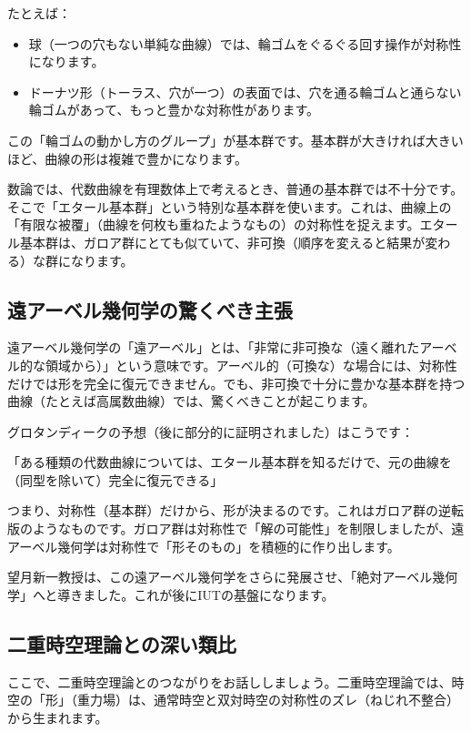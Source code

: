 \documentclass[dvipdfmx,12pt,a4paper]{jsarticle}
\begin{document}
たとえば：
\begin{itemize}
  \item 球（一つの穴もない単純な曲線）では、輪ゴムをぐるぐる回す操作が対称性になります。
  \item ドーナツ形（トーラス、穴が一つ）の表面では、穴を通る輪ゴムと通らない輪ゴムがあって、もっと豊かな対称性があります。
\end{itemize}

この「輪ゴムの動かし方のグループ」が基本群です。基本群が大きければ大きいほど、曲線の形は複雑で豊かになります。

数論では、代数曲線を有理数体上で考えるとき、普通の基本群では不十分です。そこで「エタール基本群」という特別な基本群を使います。これは、曲線上の「有限な被覆」（曲線を何枚も重ねたようなもの）の対称性を捉えます。エタール基本群は、ガロア群にとても似ていて、非可換（順序を変えると結果が変わる）な群になります。

\subsection{遠アーベル幾何学の驚くべき主張}

遠アーベル幾何学の「遠アーベル」とは、「非常に非可換な（遠く離れたアーベル的な領域から）」という意味です。アーベル的（可換な）な場合には、対称性だけでは形を完全に復元できません。でも、非可換で十分に豊かな基本群を持つ曲線（たとえば高属数曲線）では、驚くべきことが起こります。

グロタンディークの予想（後に部分的に証明されました）はこうです：

「ある種類の代数曲線については、エタール基本群を知るだけで、元の曲線を（同型を除いて）完全に復元できる」

つまり、対称性（基本群）だけから、形が決まるのです。これはガロア群の逆転版のようなものです。ガロア群は対称性で「解の可能性」を制限しましたが、遠アーベル幾何学は対称性で「形そのもの」を積極的に作り出します。

望月新一教授は、この遠アーベル幾何学をさらに発展させ、「絶対アーベル幾何学」へと導きました。これが後にIUTの基盤になります。

\subsection{二重時空理論との深い類比}

ここで、二重時空理論とのつながりをお話ししましょう。二重時空理論では、時空の「形」（重力場）は、通常時空と双対時空の対称性のズレ（ねじれ不整合）から生まれます。
\end{document}
